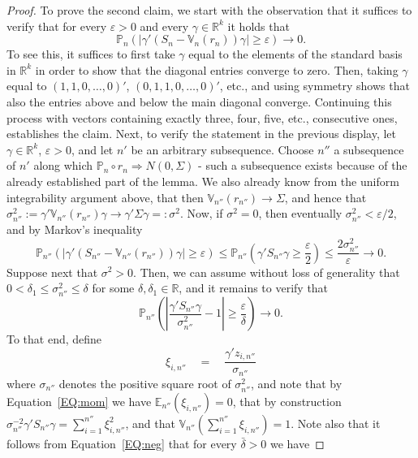 \documentclass[preprint]{imsart}
\newcommand{\R}{{\mathbb R}}
\newcommand{\eps}{\varepsilon}
\numberwithin{equation}{section}
\begin{document}
\begin{proof}
To prove the second claim, we start with the observation that it suffices to verify that for every $\varepsilon > 0$ and every $\gamma \in \R^k$ it holds that
%
\begin{equation}
\mathbb{P}_n \left(|\gamma'\left( S_n - \mathbb{V}_n(r_n) \right) \gamma | \geq \varepsilon \right) \to 0.
\end{equation}
%
To see this, it suffices to first take $\gamma$ equal to the elements of the standard basis in $\R^k$ in order to show that the diagonal entries converge to zero. Then, taking $\gamma$ equal to $(1,1,0,\dots, 0)'$, $(0,1,1,0,\dots, 0)'$, etc., and using symmetry shows that also the entries above and below the main diagonal converge. Continuing this process with vectors containing exactly three, four, five, etc., consecutive ones, establishes the claim.
Next, to verify the statement in the previous display, let $\gamma \in \R^k$, $\eps > 0$, and let $n'$ be an arbitrary subsequence. Choose $n''$ a subsequence of $n'$ along which $\mathbb{P}_n \circ r_n \Rightarrow N(0, \Sigma)$ - such a subsequence exists because of the already established part of the lemma. We also already know from the uniform integrability argument above, that then $\mathbb{V}_{n''}(r_{n''}) \rightarrow \Sigma$, and hence that $\sigma_{n''}^2 := \gamma' \mathbb{V}_{n''}(r_{n''}) \gamma \rightarrow \gamma' \Sigma \gamma =: \sigma^2$. Now, if $\sigma^2 = 0$, then eventually $\sigma_{n''}^2 < \varepsilon/2$, and by Markov's inequality
%
\begin{equation}
 \mathbb{P}_{n''} \left(\big|\gamma'\left(S_{n''}-\mathbb{V}_{n''}(r_{n''}) \right)\gamma \big| \geq \varepsilon   \right) 
\leq 
%
\mathbb{P}_{n''} \left(\gamma' S_{n''} \gamma \geq \frac{\varepsilon}{2}   \right) 
%
\leq 
%
\frac{2 \sigma_{n''}^2}  { \varepsilon}  \to 0.
\end{equation}
%
Suppose next that $\sigma^2 > 0$. Then, we can assume without loss of generality that $0 <\delta_1 \le \sigma_{n''}^2 \leq \delta$ for some $\delta,\delta_1 \in \R$, and it remains to verify that
%
\begin{equation}\label{eq:remains}
\mathbb{P}_{n''} \left( \left|\frac{\gamma' S_{n''} \gamma}{\sigma_{n''}^2 } - 1 \right| \geq \frac{\varepsilon}{\delta}   \right) \to 0.
\end{equation}
%
To that end, define
%
\begin{equation}
\xi_{i,n''} \quad = \quad \frac{\gamma' z_{i, n''}}{\sigma_{n''}}
\end{equation}
%
where $\sigma_{n''}$ denotes the positive square root of $\sigma_{n''}^2$, and note that by Equation~\eqref{EQ:mom} we have $\mathbb{E}_{n''} (\xi_{i,n''} ) = 0$, that by construction $\sigma_{n''}^{-2} \gamma' S_{n''} \gamma = \sum_{i = 1}^{n''} \xi_{i,n''}^2$, and that $\mathbb{V}_{n''}(\sum_{i = 1}^{n''} \xi_{i,n''}) = 1$. Note also that it follows from Equation~\eqref{EQ:neg} that for every $\bar{\delta} > 0$ we have

\end{proof}
\end{document}
